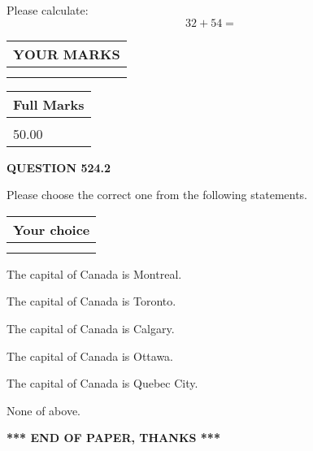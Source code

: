 \documentclass[12pt]{article}
\begin{document}
  
 
Please calculate:
\begin{equation}
32 +  %
54 = \nonumber
\end{equation}
 

 

 
  
\vspace{0.2in}
  
\noindent\begin{tabular}{|l|}
\hline
 YOUR MARKS  \\
\hline
 \\ 
 \\ 
\hline
\end{tabular}
\hspace{0.05in} \begin{tabular}{|l|}
\hline
 Full Marks  \\
\hline
 \\ 
50.00 \\
\hline
\end{tabular}
{\textbf{\Large{QUESTION
524.2 
}}}
  
  
Please choose the correct one from the following statements.
  
  
\noindent\hspace{3.0in} \begin{tabular}{|l|}
\hline
Your choice \\
\hline
 \\ 
 \\ 
\hline
\end{tabular}
  
  
 
 
The capital of Canada is Montreal.
 
 
The capital of Canada is Toronto.
 
 
The capital of Canada is Calgary.
 
 
The capital of Canada is Ottawa.
 
 
The capital of Canada is Quebec City.
 
 
 None of above.
 
 
   
   
 \vspace{0.2in}
 
   
   
   
   
\vspace{1.0in} 
{\textbf{\large{ *** END OF PAPER, THANKS *** }}} 
   
\end{document}
